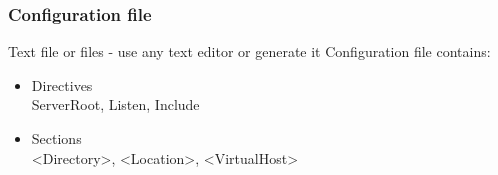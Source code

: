 \begin{frame}[fragile]
        \frametitle{Configuration file}
Text file or files - use any text editor or generate it
Configuration file contains:
\begin{itemize}
    \item Directives \\
        ServerRoot, Listen, Include
    \item Sections \\
         <Directory>, <Location>, <VirtualHost>  
\end{itemize}
\end{frame}
